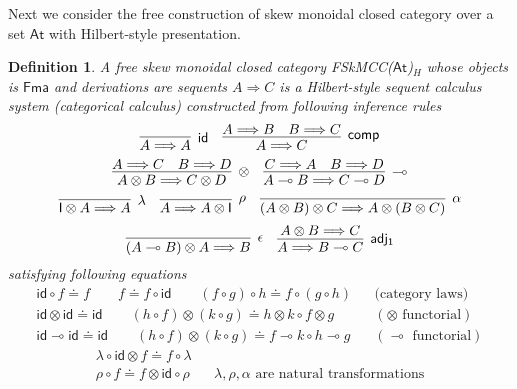 \documentclass[submission,copyright,creativecommons]{eptcs}
\newtheorem{defn}[theorem]{Definition}
\newcommand{\id}{\mathsf{id}}
\newcommand{\ot}{\otimes}
\newcommand{\lolli}{\multimap}
\newcommand{\I}{\mathsf{I}}
\begin{document}
  Next we consider the free construction of skew monoidal closed category over a set $\mathsf{At}$ with Hilbert-style presentation.
  \begin{defn}
    A free skew monoidal closed category FSkMCC($\mathsf{At}$)$_{H}$ whose objects is $\mathsf{Fma}$ and derivations are sequents $A \Longrightarrow C$ is a Hilbert-style sequent calculus system (categorical calculus) constructed from following inference rules
    \begin{displaymath}
        \infer[\id]{A \Longrightarrow A}{}
        \quad
        \infer[\mathsf{comp}]{A \Longrightarrow C}{
          A \Longrightarrow B
          &
          B \Longrightarrow C
        }
    \end{displaymath}
    \begin{displaymath}
      \infer[\otimes]{A \ot B \Longrightarrow C \ot D}{
        A \Longrightarrow C
        &
        B \Longrightarrow D
      }
      \quad
      \infer[\lolli]{A \lolli B \Longrightarrow C \lolli D}{
        C \Longrightarrow A
        &
        B \Longrightarrow D
      }
    \end{displaymath}
    \begin{displaymath}
      \infer[\lambda]{\I \ot A \Longrightarrow A}{}
      \quad
      \infer[\rho]{A \Longrightarrow A \ot \I}{}
      \quad
      \infer[\alpha]{(A \ot B) \ot C \Longrightarrow A \ot (B \ot C)}{}
    \end{displaymath}
    \begin{displaymath}
      \infer[\epsilon]{(A \lolli B) \ot A \Longrightarrow B}{}
      \quad
      \infer[\mathsf{adj_1}]{A \Longrightarrow B \lolli C}{A \ot B \Longrightarrow C}
    \end{displaymath}
    satisfying following equations
    \begin{align*}
      \id \circ f \doteq f \qquad f \doteq f \circ \id \qquad (f \circ g) \circ h \doteq f \circ (g \circ h) &&\text{(category laws)}
      \\
      \id \ot \id \doteq \id \qquad (h \circ f) \ot (k \circ g) \doteq h \ot k \circ f \ot g &&(\ot \text{ functorial})
      \\
      \id \lolli \id \doteq \id \qquad (h \circ f) \ot (k \circ g) \doteq f \lolli k \circ h \lolli g &&(\lolli \text{ functorial})
    \end{align*}
    \begin{align*}
        \lambda \circ \id \ot f \doteq f \circ \lambda
        \\
        \rho \circ f \doteq f \ot \id \circ \rho &&\lambda , \rho , \alpha \text{ are natural transformations}

\end{align*}
\end{defn}
\end{document}
